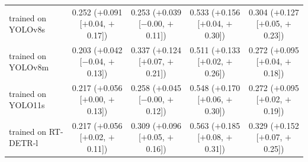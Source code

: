 \begin{table}[htbp]
{\begin{tabular}{@{}lcccc@{}}
\quad trained on YOLOv8s & 0.252 ($+$0.091 [$+$0.04, $+$0.17]) & 0.253 ($+$0.039 [$-$0.00, $+$0.11]) & 0.533 ($+$0.156 [$+$0.04, $+$0.30]) & 0.304 ($+$0.127 [$+$0.05, $+$0.23])\\
\quad trained on YOLOv8m & 0.203 ($+$0.042 [$-$0.04, $+$0.13]) & 0.337 ($+$0.124 [$+$0.07, $+$0.21]) & 0.511 ($+$0.133 [$+$0.02, $+$0.26]) & 0.272 ($+$0.095 [$+$0.04, $+$0.18])\\
\quad trained on YOLO11s & 0.217 ($+$0.056 [$+$0.00, $+$0.13]) & 0.258 ($+$0.045 [$-$0.00, $+$0.12]) & 0.548 ($+$0.170 [$+$0.06, $+$0.30]) & 0.272 ($+$0.095 [$+$0.02, $+$0.19])\\
\quad trained on RT-DETR-l & 0.217 ($+$0.056 [$+$0.02, $+$0.11]) & 0.309 ($+$0.096 [$+$0.05, $+$0.16]) & 0.563 ($+$0.185 [$+$0.08, $+$0.31]) & 0.329 ($+$0.152 [$+$0.07, $+$0.25])\\
\bottomrule
\end{tabular}}
\end{table}

